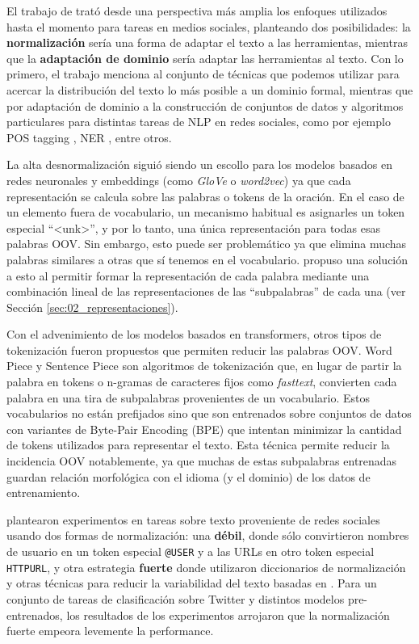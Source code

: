 El trabajo de \citet{eisenstein2013bad} trató desde una perspectiva más amplia los enfoques utilizados hasta el momento para tareas en medios sociales, planteando dos posibilidades: la \textbf{normalización} sería una forma de adaptar el texto a las herramientas, mientras que la \textbf{adaptación de dominio} sería adaptar las herramientas al texto. Con lo primero, el trabajo menciona al conjunto de técnicas que podemos utilizar para acercar la distribución del texto lo más posible a un dominio formal, mientras que por adaptación de dominio a la construcción de conjuntos de datos y algoritmos particulares para distintas tareas de NLP en redes sociales, como por ejemplo POS tagging \cite{gimpel2010part}, NER \cite{ritter2011named}, entre otros.


La alta desnormalización siguió siendo un escollo para los modelos basados en redes neuronales y embeddings (como \emph{GloVe} o \emph{word2vec}) ya que cada representación se calcula sobre las palabras o tokens de la oración. En el caso de un elemento fuera de vocabulario, un mecanismo habitual es asignarles un token especial ``<unk>'', y por lo tanto, una única representación para todas esas palabras OOV. Sin embargo, esto puede ser problemático ya que elimina muchas palabras similares a otras que sí tenemos en el vocabulario. \citet{bojanowski16} propuso una solución a esto al permitir formar la representación de cada palabra mediante una combinación lineal de las representaciones de las ``subpalabras'' de cada una (ver Sección \ref{sec:02_representaciones}).

Con el advenimiento de los modelos basados en transformers, otros tipos de tokenización fueron propuestos que permiten reducir las palabras OOV. Word Piece \cite{schuster2012japanese} y Sentence Piece \cite{kudo-richardson-2018-sentencepiece} son algoritmos de tokenización que, en lugar de partir la palabra en tokens o n-gramas de caracteres fijos como \emph{fasttext}, convierten cada palabra en una tira de subpalabras provenientes de un vocabulario. Estos vocabularios no están prefijados sino que son entrenados sobre conjuntos de datos con variantes de Byte-Pair Encoding (BPE) \cite{sennrich2016neural} que intentan minimizar la cantidad de tokens utilizados para representar el texto. Esta técnica permite reducir la incidencia OOV notablemente, ya que muchas de estas subpalabras entrenadas guardan relación morfológica con el idioma (y el dominio) de los datos de entrenamiento.

\citet{dat2020bertweet} plantearon experimentos en tareas sobre texto proveniente de redes sociales usando dos formas de normalización: una \textbf{débil}, donde sólo convirtieron nombres de usuario en un token especial \verb|@USER| y a las URLs en otro token especial \verb|HTTPURL|, y otra estrategia \textbf{fuerte} donde utilizaron diccionarios de normalización y otras técnicas para reducir la variabilidad del texto basadas en \citet{han2011lexical}. Para un conjunto de tareas de clasificación sobre Twitter y distintos modelos pre-entrenados, los resultados de los experimentos arrojaron que la normalización fuerte empeora levemente la performance.

